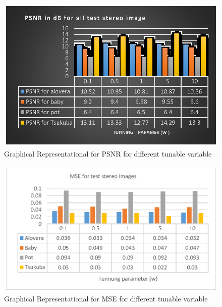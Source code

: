 \documentclass{singlecol-new}
\theoremstyle{TH}{
\newtheorem{lemma}{Lemma}
\newtheorem{theorem}[lemma]{Theorem}
\newtheorem{corrolary}[lemma]{Corrolary}
\newtheorem{conjecture}[lemma]{Conjecture}
\newtheorem{proposition}[lemma]{Proposition}
\newtheorem{claim}[lemma]{Claim}
\newtheorem{stheorem}[lemma]{Wrong Theorem}
\newtheorem{algorithm}{Algorithm}
}
\theoremstyle{THrm}{
\newtheorem{definition}{Definition}[section]
\newtheorem{question}{Question}[section]
\newtheorem{remark}{Remark}
\newtheorem{scheme}{Scheme}
}
\theoremstyle{THhit}{
\newtheorem{case}{Case}[section]
}
\begin{document}
\begin{figure}
\includegraphics{psnrw.eps}
\caption{Graphical Representational for PSNR for different tunable variable}\label{fig:editpublish}
\end{figure}
\begin{figure}
\includegraphics{msew.eps}
\caption{Graphical Representational for MSE for different tunable variable}\label{fig:editpublish}
\end{figure}
\end{document}
